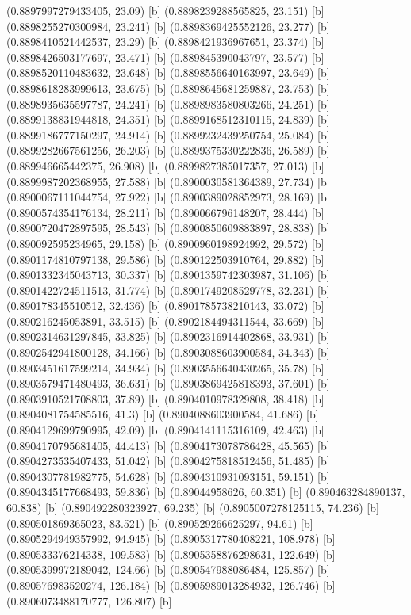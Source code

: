 {{{(0.8897997279433405, 23.09) [b] 
(0.8898239288565825, 23.151) [b] 
(0.8898255270300984, 23.241) [b] 
(0.8898369425552126, 23.277) [b] 
(0.8898410521442537, 23.29) [b] 
(0.8898421936967651, 23.374) [b] 
(0.8898426503177697, 23.471) [b] 
(0.889845390043797, 23.577) [b] 
(0.8898520110483632, 23.648) [b] 
(0.8898556640163997, 23.649) [b] 
(0.8898618283999613, 23.675) [b] 
(0.8898645681259887, 23.753) [b] 
(0.8898935635597787, 24.241) [b] 
(0.8898983580803266, 24.251) [b] 
(0.8899138831944818, 24.351) [b] 
(0.8899168512310115, 24.839) [b] 
(0.8899186777150297, 24.914) [b] 
(0.8899232439250754, 25.084) [b] 
(0.8899282667561256, 26.203) [b] 
(0.8899375330222836, 26.589) [b] 
(0.889946665442375, 26.908) [b] 
(0.8899827385017357, 27.013) [b] 
(0.8899987202368955, 27.588) [b] 
(0.8900030581364389, 27.734) [b] 
(0.8900067111044754, 27.922) [b] 
(0.8900389028852973, 28.169) [b] 
(0.8900574354176134, 28.211) [b] 
(0.890066796148207, 28.444) [b] 
(0.8900720472897595, 28.543) [b] 
(0.8900850609883897, 28.838) [b] 
(0.890092595234965, 29.158) [b] 
(0.8900960198924992, 29.572) [b] 
(0.8901174810797138, 29.586) [b] 
(0.890122503910764, 29.882) [b] 
(0.8901332345043713, 30.337) [b] 
(0.8901359742303987, 31.106) [b] 
(0.8901422724511513, 31.774) [b] 
(0.8901749208529778, 32.231) [b] 
(0.890178345510512, 32.436) [b] 
(0.8901785738210143, 33.072) [b] 
(0.890216245053891, 33.515) [b] 
(0.8902184494311544, 33.669) [b] 
(0.8902314631297845, 33.825) [b] 
(0.8902316914402868, 33.931) [b] 
(0.8902542941800128, 34.166) [b] 
(0.8903088603900584, 34.343) [b] 
(0.8903451617599214, 34.934) [b] 
(0.8903556640430265, 35.78) [b] 
(0.8903579471480493, 36.631) [b] 
(0.8903869425818393, 37.601) [b] 
(0.8903910521708803, 37.89) [b] 
(0.8904010978329808, 38.418) [b] 
(0.8904081754585516, 41.3) [b] 
(0.8904088603900584, 41.686) [b] 
(0.8904129699790995, 42.09) [b] 
(0.8904141115316109, 42.463) [b] 
(0.8904170795681405, 44.413) [b] 
(0.8904173078786428, 45.565) [b] 
(0.8904273535407433, 51.042) [b] 
(0.8904275818512456, 51.485) [b] 
(0.8904307781982775, 54.628) [b] 
(0.8904310931093151, 59.151) [b] 
(0.8904345177668493, 59.836) [b] 
(0.89044958626, 60.351) [b] 
(0.890463284890137, 60.838) [b] 
(0.890492280323927, 69.235) [b] 
(0.8905007278125115, 74.236) [b] 
(0.890501869365023, 83.521) [b] 
(0.890529266625297, 94.61) [b] 
(0.8905294949357992, 94.945) [b] 
(0.8905317780408221, 108.978) [b] 
(0.890533376214338, 109.583) [b] 
(0.8905358876298631, 122.649) [b] 
(0.8905399972189042, 124.66) [b] 
(0.890547988086484, 125.857) [b] 
(0.890576983520274, 126.184) [b] 
(0.8905989013284932, 126.746) [b] 
(0.8906073488170777, 126.807) [b] 
}}}
